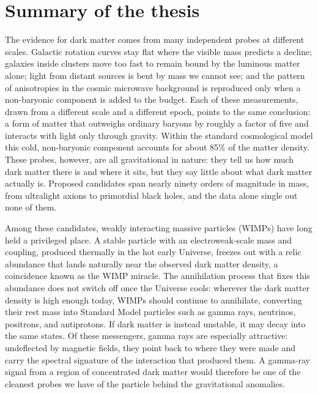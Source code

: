 \chapter*{Summary of the thesis}

The evidence for dark matter comes from many independent probes at different scales. Galactic rotation curves stay flat where the visible mass predicts a decline; galaxies inside clusters move too fast to remain bound by the luminous matter alone; light from distant sources is bent by mass we cannot see; and the pattern of anisotropies in the cosmic microwave background is reproduced only when a non-baryonic component is added to the budget. Each of these measurements, drawn from a different scale and a different epoch, points to the same conclusion: a form of matter that outweighs ordinary baryons by roughly a factor of five and interacts with light only through gravity. Within the standard cosmological model this cold, non-baryonic component accounts for about 85\% of the matter density. These probes, however, are all gravitational in nature: they tell us how much dark matter there is and where it sits, but they say little about what dark matter actually is. Proposed candidates span nearly ninety orders of magnitude in mass, from ultralight axions to primordial black holes, and the data alone single out none of them.

Among these candidates, weakly interacting massive particles (WIMPs) have long held a privileged place. A stable particle with an electroweak-scale mass and coupling, produced thermally in the hot early Universe, freezes out with a relic abundance that lands naturally near the observed dark matter density, a coincidence known as the WIMP miracle. The annihilation process that fixes this abundance does not switch off once the Universe cools: wherever the dark matter density is high enough today, WIMPs should continue to annihilate, converting their rest mass into Standard Model particles such as gamma rays, neutrinos, positrons, and antiprotons. If dark matter is instead unstable, it may decay into the same states. Of these messengers, gamma rays are especially attractive: undeflected by magnetic fields, they point back to where they were made and carry the spectral signature of the interaction that produced them. A gamma-ray signal from a region of concentrated dark matter would therefore be one of the cleanest probes we have of the particle behind the gravitational anomalies.

